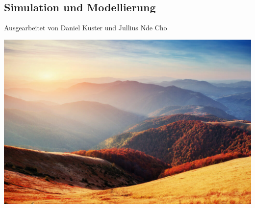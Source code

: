 \documentclass{article}
\begin{document}
\begin{center}
 \section*{Simulation und Modellierung}
 Ausgearbeitet von Daniel Kuster und Jullius Nde Cho
\end{center}
\includegraphics{sample}
\end{document}
